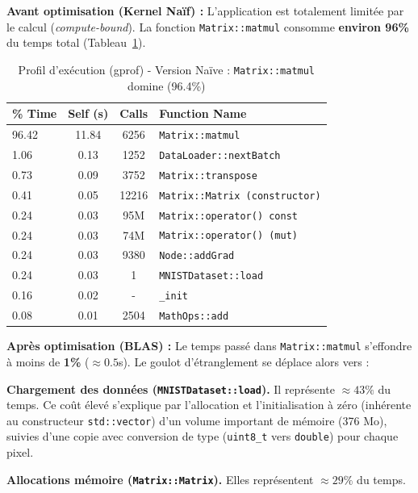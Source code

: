 \documentclass[a4paper,11pt]{article}
\begin{document}
\textbf{Avant optimisation (Kernel Naïf) :}
L'application est totalement limitée par le calcul (\emph{compute-bound}). La fonction \texttt{Matrix::matmul} consomme \textbf{environ 96\%} du temps total (Tableau~\ref{tab:gprof_naive}).

\begin{table}[H]
    \centering
    \caption{Profil d'exécution (gprof) - Version Naïve : \texttt{Matrix::matmul} domine (96.4\%)}
    \label{tab:gprof_naive}
    \begin{tabular}{lccl}
        \toprule
        \textbf{\% Time} & \textbf{Self (s)} & \textbf{Calls} & \textbf{Function Name} \\
        \midrule
        96.42 & 11.84 & 6256 & \texttt{Matrix::matmul} \\
        1.06 & 0.13 & 1252 & \texttt{DataLoader::nextBatch} \\
        0.73 & 0.09 & 3752 & \texttt{Matrix::transpose} \\
        0.41 & 0.05 & 12216 & \texttt{Matrix::Matrix (constructor)} \\
        0.24 & 0.03 & 95M & \texttt{Matrix::operator() const} \\
        0.24 & 0.03 & 74M & \texttt{Matrix::operator() (mut)} \\
        0.24 & 0.03 & 9380 & \texttt{Node::addGrad} \\
        0.24 & 0.03 & 1 & \texttt{MNISTDataset::load} \\
        0.16 & 0.02 & - & \texttt{\_init} \\
        0.08 & 0.01 & 2504 & \texttt{MathOps::add} \\
        \bottomrule
    \end{tabular}
\end{table}

\textbf{Après optimisation (BLAS) :}
Le temps passé dans \texttt{Matrix::matmul} s'effondre à moins de \textbf{1\%} ($\approx 0.5$s). Le goulot d'étranglement se déplace alors vers :
\par\smallskip
\noindent\textbf{Chargement des données (\texttt{MNISTDataset::load}).} Il représente $\approx 43\%$ du temps. Ce coût élevé s'explique par l'allocation et l'initialisation à zéro (inhérente au constructeur \texttt{std::vector}) d'un volume important de mémoire (376 Mo), suivies d'une copie avec conversion de type (\texttt{uint8\_t} vers \texttt{double}) pour chaque pixel.
\par\smallskip
\noindent\textbf{Allocations mémoire (\texttt{Matrix::Matrix}).} Elles représentent $\approx 29\%$ du temps.
\end{document}
